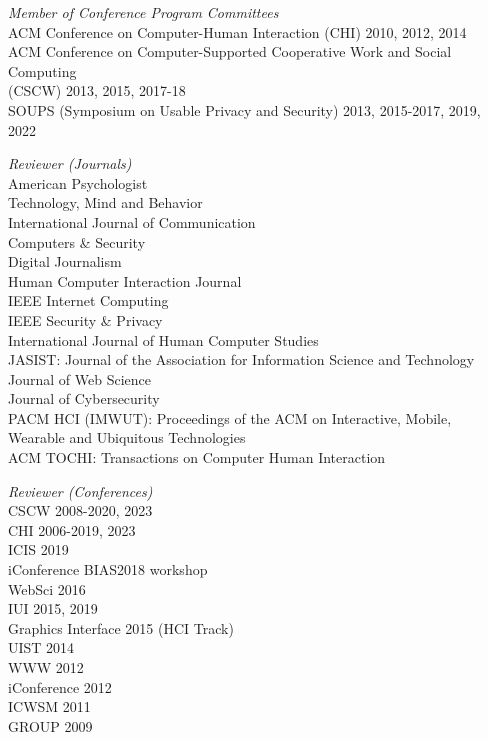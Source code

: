 \documentclass[9pt]{extarticle}
\begin{document}
\emph{Member of Conference Program Committees} \\
\vspace{1pt}
ACM Conference on Computer-Human Interaction (CHI) 2010, 2012, 2014 \\
ACM Conference on Computer-Supported Cooperative Work and Social Computing \\
\hspace{0.5cm} (CSCW) 2013, 2015, 2017-18 \\
SOUPS (Symposium on Usable Privacy and Security) 2013, 2015-2017, 2019, 2022

\emph{Reviewer (Journals)} \\
\vspace{1pt}
American Psychologist \\
Technology, Mind and Behavior \\
International Journal of Communication \\
Computers \& Security \\ 
Digital Journalism \\
Human Computer Interaction Journal \\
IEEE Internet Computing \\
IEEE Security \& Privacy \\
International Journal of Human Computer Studies \\
JASIST: Journal of the Association for Information Science and Technology \\
Journal of Web Science \\
Journal of Cybersecurity \\ 
PACM HCI (IMWUT): Proceedings of the ACM on Interactive, Mobile, Wearable and Ubiquitous Technologies \\ 
ACM TOCHI: Transactions on Computer Human Interaction


\emph{Reviewer (Conferences)} \\
\vspace{1pt}
CSCW 2008-2020, 2023 \\
CHI 2006-2019, 2023 \\
ICIS 2019 \\
iConference BIAS2018 workshop \\
WebSci 2016 \\
IUI 2015, 2019 \\
Graphics Interface 2015 (HCI Track) \\
UIST 2014 \\
WWW 2012 \\
iConference 2012 \\
ICWSM 2011 \\
GROUP 2009
\end{document}
